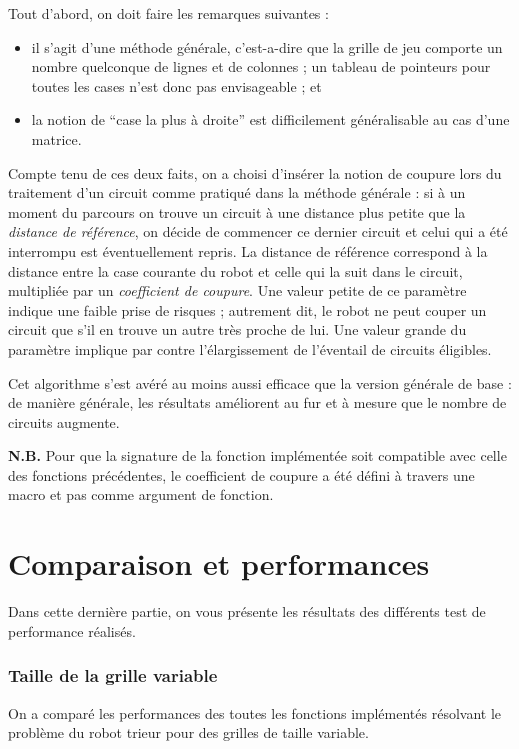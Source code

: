 \documentclass[12pt,a4paper]{article}
\begin{document}
Tout d'abord, on doit faire les remarques suivantes : 
\begin{itemize}
  \item il s'agit d'une m\'ethode g\'en\'erale, c'est-a-dire que la grille de 
jeu comporte un nombre quelconque de lignes et de colonnes ; un tableau de 
pointeurs pour toutes les cases n'est donc pas envisageable ; et
\item la notion de \enquote{case la plus \`a droite} est difficilement 
g\'en\'eralisable au cas d'une matrice.
\end{itemize}

Compte tenu de ces deux faits, on a choisi d'ins\'erer la notion de coupure 
lors du traitement d'un circuit comme pratiqu\'e dans la m\'ethode g\'en\'erale 
: si \`a un moment du parcours on trouve un circuit \`a une distance plus 
petite que la {\itshape distance de r\'ef\'erence}, on d\'ecide de 
commencer ce dernier circuit et celui qui a \'et\'e interrompu est 
\'eventuellement repris. La distance de r\'ef\'erence correspond \`a la 
distance entre la case courante du robot et celle qui la suit dans le circuit, 
multipli\'ee par un {\itshape coefficient de coupure}. Une valeur petite de 
ce param\`etre indique une faible prise de risques ; autrement dit, le robot ne 
peut couper un circuit que s'il en trouve un autre tr\`es proche de lui. Une 
valeur grande du param\`etre implique par contre l'\'elargissement de 
l'\'eventail de circuits \'eligibles.

Cet algorithme s'est av\'er\'e au moins aussi efficace que la version 
g\'en\'erale de base : de mani\`ere g\'en\'erale, les r\'esultats 
am\'eliorent au fur et \`a mesure que le nombre de circuits augmente.

{\bfseries N.B.} Pour que la signature de la fonction impl\'ement\'ee soit 
compatible avec celle des fonctions pr\'ec\'edentes, le coefficient de coupure a 
\'et\'e d\'efini \`a travers une macro et pas comme argument de fonction.

\newpage

\part{Comparaison et performances}
Dans cette derni\`ere partie, on vous pr\'esente les r\'esultats des 
diff\'erents test de performance r\'ealis\'es.

\section{Taille de la grille variable} \label{size_var}
On a compar\'e les performances des toutes les fonctions 
impl\'ement\'es r\'esolvant le probl\`eme du robot trieur pour des grilles de 
taille variable.
\end{document}
